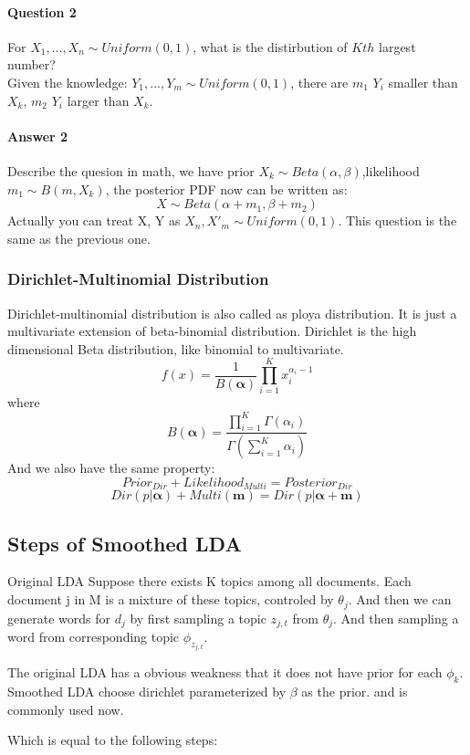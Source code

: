 \documentclass{article}
\begin{document}
\paragraph{Question 2} For $X_{1},...,X_{n} \sim Uniform(0,1)$, what is the distirbution of $Kth$ largest number? \\
Given the knowledge: $Y_{1},...,Y_{m} \sim Uniform(0,1)$, there are $m_{1}$ $Y_{i}$ smaller than $X_{k}$, $m_{2}$ $Y_{i}$ larger than $X_{k}$.

\paragraph{Answer 2}
Describe the quesion in math, we have prior $X_{k} \sim Beta(\alpha,\beta)$,likelihood $m_{1} \sim B(m,X_{k})$, the posterior PDF now can be written as:
$$X \sim Beta(\alpha+m_{1},\beta+m_{2})$$
Actually you can treat X, Y as $X_{n},X'_{m} \sim Uniform(0,1)$. This question is the same as the previous one.

\subsubsection{Dirichlet-Multinomial Distribution}
Dirichlet-multinomial distribution is also called as ploya distribution. It is just a multivariate extension of beta-binomial distribution. Dirichlet is the high dimensional Beta distribution, like binomial to multivariate.
$$f(x)=\frac{1}{B(\bm{\alpha} )}\prod_{i=1}^{K}x_{i}^{\alpha_{i}-1}$$
where 
$$B(\bm{\alpha})=\frac{\prod_{i=1}^{K} \Gamma(\alpha_{i})}{\Gamma(\sum_{i=1}^{K}\alpha_{i})}$$
And we also have the same property:
$$Prior_{Dir} + Likelihood_{Multi} = Posterior_{Dir}$$
$$Dir(p|\bm{\alpha})+Multi(\bm{m})=Dir(p|\bm{\alpha+m})$$
\subsection{Steps of Smoothed LDA}
Original LDA Suppose there exists K topics among all documents. Each document j in M is a mixture of these topics, controled by $\theta_{j}$. And then we can  generate words for $d_{j}$ by first sampling a topic $z_{j,t}$ from $\theta_{j}$. And then sampling a word from corresponding topic $\phi_{z_{j,t}}$.

The original LDA has a obvious weakness that it does not have prior for each $\phi_{k}$.  Smoothed LDA choose dirichlet parameterized by $\beta$ as the prior. and is commonly used now.

Which is equal to the following steps: 
\end{document}
